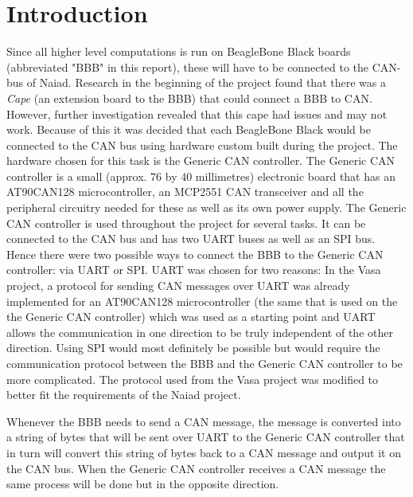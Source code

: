 
\section{Introduction}\label{sec:introduction}
Since all higher level computations is run on BeagleBone Black boards (abbreviated "BBB" in this report), these will have to be connected to the CAN-bus of Naiad. Research in the beginning of the project found that there was a \emph{Cape} (an extension board to the BBB) that could connect a BBB to CAN. However, further investigation revealed that this cape had issues and may not work. Because of this it was decided that each BeagleBone Black would be connected to the CAN bus using hardware custom built during the project. The hardware chosen for this task is the Generic CAN controller. \newline
The Generic CAN controller is a small (approx. 76 by 40 millimetres) electronic board that has an AT90CAN128 microcontroller, an MCP2551 CAN transceiver and all the peripheral circuitry needed for these as well as its own power supply. The Generic CAN controller is used throughout the project for several tasks. It can be connected to the CAN bus and has two UART buses as well as an SPI bus. \newline
Hence there were two possible ways to connect the BBB to the Generic CAN controller: via UART or SPI. \newline
UART was chosen for two reasons: In the Vasa project, a protocol for sending CAN messages over UART was already implemented for an AT90CAN128 microcontroller (the same that is used on the the Generic CAN controller) which was used as a starting point and UART allows the communication in one direction to be truly independent of the other direction. Using SPI would most definitely be possible but would require the communication protocol between the BBB and the Generic CAN controller to be more complicated.  \newline
The protocol used from the Vasa project was modified to better fit the requirements of the Naiad project.

Whenever the BBB needs to send a CAN message, the message is converted into a string of bytes that will be sent over UART to the Generic CAN controller that in turn will convert this string of bytes back to a CAN message and output it on the CAN bus. When the Generic CAN controller receives a CAN message the same process will be done but in the opposite direction. 
